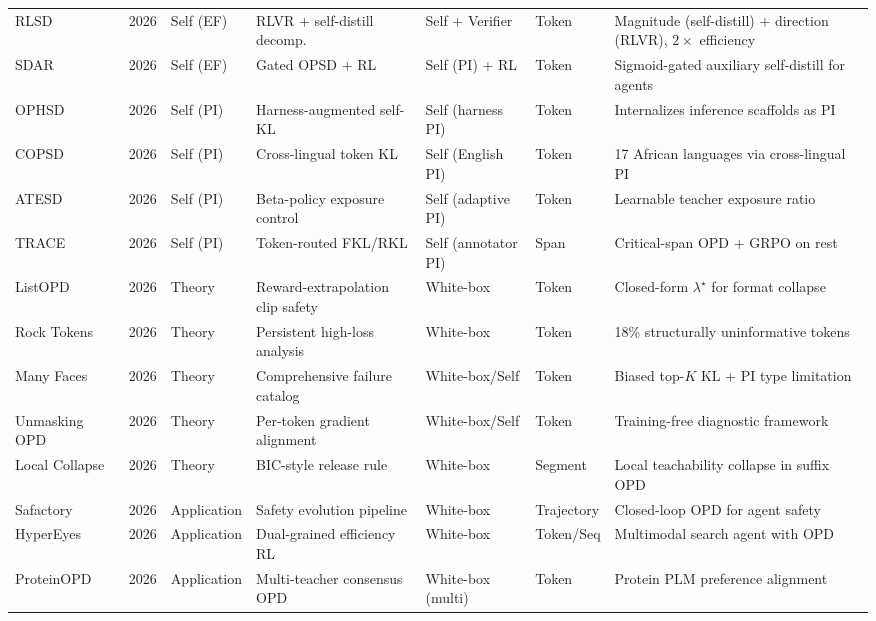 \documentclass{article} %
\begin{document}
\begin{table}[t]
{\begin{tabular}{@{}lclllll@{}}
        RLSD~\citep{2604.03128} & 2026 & Self (EF) & RLVR + self-distill decomp. & Self + Verifier & Token & Magnitude (self-distill) + direction (RLVR), $2\times$ efficiency \\
        SDAR~\citep{2605.15155} & 2026 & Self (EF) & Gated OPSD + RL & Self (PI) + RL & Token & Sigmoid-gated auxiliary self-distill for agents \\
        OPHSD~\citep{2605.08741} & 2026 & Self (PI) & Harness-augmented self-KL & Self (harness PI) & Token & Internalizes inference scaffolds as PI \\
        COPSD~\citep{2605.09548} & 2026 & Self (PI) & Cross-lingual token KL & Self (English PI) & Token & 17 African languages via cross-lingual PI \\
        ATESD~\citep{2605.11458} & 2026 & Self (PI) & Beta-policy exposure control & Self (adaptive PI) & Token & Learnable teacher exposure ratio \\
        TRACE~\citep{2605.10194} & 2026 & Self (PI) & Token-routed FKL/RKL & Self (annotator PI) & Span & Critical-span OPD + GRPO on rest \\
        ListOPD~\citep{2605.08737} & 2026 & Theory & Reward-extrapolation clip safety & White-box & Token & Closed-form $\lambda^\star$ for format collapse \\
        Rock Tokens~\citep{2605.09253} & 2026 & Theory & Persistent high-loss analysis & White-box & Token & 18\% structurally uninformative tokens \\
        Many Faces~\citep{2605.11182} & 2026 & Theory & Comprehensive failure catalog & White-box/Self & Token & Biased top-$K$ KL + PI type limitation \\
        Unmasking OPD~\citep{2605.10889} & 2026 & Theory & Per-token gradient alignment & White-box/Self & Token & Training-free diagnostic framework \\
        Local Collapse~\citep{2605.13643} & 2026 & Theory & BIC-style release rule & White-box & Segment & Local teachability collapse in suffix OPD \\
        Safactory~\citep{2605.06230} & 2026 & Application & Safety evolution pipeline & White-box & Trajectory & Closed-loop OPD for agent safety \\
        HyperEyes~\citep{2605.07177} & 2026 & Application & Dual-grained efficiency RL & White-box & Token/Seq & Multimodal search agent with OPD \\
        ProteinOPD~\citep{2605.10189} & 2026 & Application & Multi-teacher consensus OPD & White-box (multi) & Token & Protein PLM preference alignment \\

\end{tabular}}
\end{table}
\end{document}
